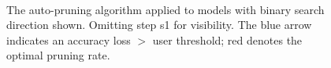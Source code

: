  \begin{figure} 
    \centering
    \hspace*{\fill}
   \\
 \hspace*{\fill}
   \caption{ The auto-pruning algorithm applied to models with binary search direction shown. Omitting step s1 for visibility. The blue arrow indicates an accuracy loss $>$ user threshold; red denotes the optimal pruning rate. }
   \label{fig:auto_pruning} 
 \end{figure}








